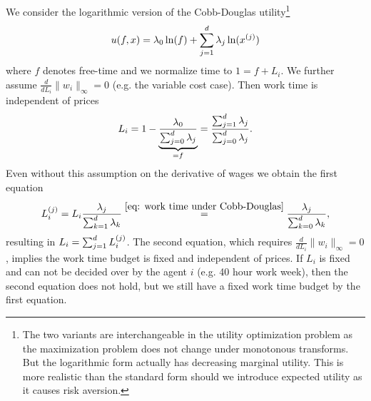 \begin{lemma}
	We consider the logarithmic version of the Cobb-Douglas utility\footnote{
		The two variants are interchangeable in the utility optimization problem
		as the maximization problem does not change under monotonous transforms.
		But the logarithmic form actually has decreasing marginal utility. This is
		more realistic than the standard form should we introduce expected utility
		as it causes risk aversion.
	}
	\[
		u(f,x) = \lambda_0 \ln(f) + \sum_{j=1}^d \lambda_j \ln(x^{(j)})
	\]
	where \(f\) denotes free-time and we normalize time to \(1=f+L_i\). We
	further assume	 \(\frac{d}{dL_i}\|w_i\|_\infty=0\) (e.g. the variable cost
	case). Then work time is independent of prices
	\begin{equation}\label{eq: work time under Cobb-Douglas}
		L_i = 1- \underbrace{\frac{\lambda_0}{\sum_{j=0}^d \lambda_j}}_{=f}
		= \frac{\sum_{j=1}^d \lambda_j}{\sum_{j=0}^d \lambda_j}.
	\end{equation}
	Even without this assumption on the derivative of wages we obtain
	the first equation
	\[
		L_i^{(j)}
		= L_i\frac{\lambda_j}{\sum_{k=1}^d\lambda_k}
		\overset{\eqref{eq: work time under Cobb-Douglas}}=
		\frac{\lambda_j}{\sum_{k=0}^d\lambda_k},
	\]
	resulting in  \(L_i = \sum_{j=1}^d L_i^{(j)}\). The second equation,
	which requires \(\frac{d}{dL_i}\|w_i\|_\infty=0\), implies the work time
	budget is fixed and independent of prices. If \(L_i\) is fixed and can
	not be decided over by the agent \(i\) (e.g. 40 hour work week), then
	the second equation does not hold, but we still have a fixed work time
	budget by the first equation.
\end{lemma}
